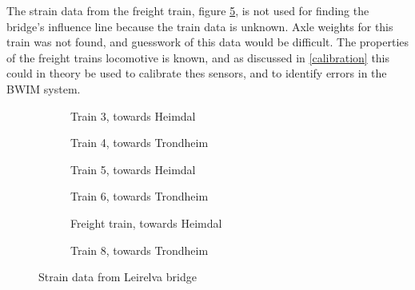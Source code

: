The strain data from the freight train, figure \ref{fig:strain_train7}, is not used for finding the bridge's influence line because the train data is unknown. Axle weights for this train was not found, and guesswork of this data would be difficult. The properties of the freight trains locomotive is known, and as discussed in \ref{calibration} this could in theory be used to calibrate thes sensors, and to identify errors in the BWIM system.
\begin{figure}[H]
	\centering
	\begin{subfigure}[t]{0.4\textwidth}
		\centering
		
		\caption{Train 3, towards Heimdal}
		\label{fig:strain_train3}
	\end{subfigure}
	\qquad
	\begin{subfigure}[t]{0.4\textwidth}
		\centering
		
		\caption{Train 4, towards Trondheim}
		\label{fig:strain_train4}
	\end{subfigure}

	\begin{subfigure}[t]{0.4\textwidth}
		\centering
		
		\caption{Train 5, towards Heimdal}
		\label{fig:strain_train5}
	\end{subfigure}
	\qquad
  \begin{subfigure}[t]{0.4\textwidth}
    \centering
    
		\caption{Train 6, towards Trondheim}
    \label{fig:strain_train6}
  \end{subfigure}

  \begin{subfigure}[t]{0.4\textwidth}
    \centering
    
		\caption{Freight train, towards Heimdal}
    \label{fig:strain_train7}
  \end{subfigure}
    \qquad
	\begin{subfigure}[t]{0.4\textwidth}
		\centering
		
		\caption{Train 8, towards Trondheim}
		\label{fig:strain_train8}
	\end{subfigure}
  \caption{Strain data from Leirelva bridge}
  \label{fig:strain_all}
\end{figure}
